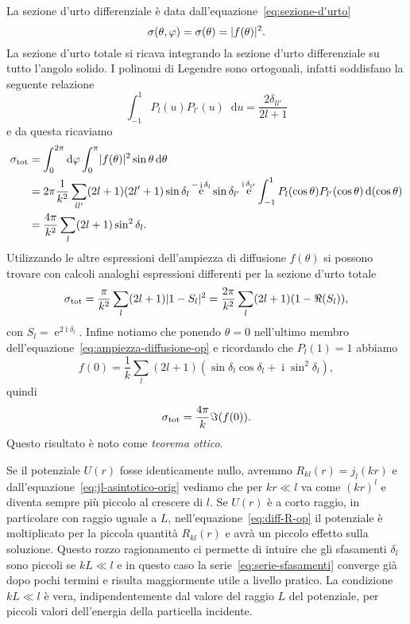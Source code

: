 \documentclass[a4paper,fleqn,twoside,12pt]{article}
\renewcommand{\phi}{\varphi}
\newcommand*{\dd}{\mathop{}\!\mathrm{d}} %
\DeclareMathOperator{\e}{\mathrm{e}} %
\DeclareMathOperator{\uimm}{\mathrm{i}} %
\DeclarePairedDelimiter{\abs}{\lvert}{\rvert}
\begin{document}
La sezione d'urto differenziale è data dall'equazione~\eqref{eq:sezione-d'urto}
\begin{equation}
  \sigma(\theta,\phi) = \sigma(\theta) = \abs{f(\theta)}^{2}.
\end{equation}
La sezione d'urto totale si ricava integrando la sezione d'urto differenziale su
tutto l'angolo solido.  I polinomi di Legendre sono ortogonali, infatti
soddisfano la seguente relazione
\begin{equation}
  \int_{-1}^{1}P_{l}(u)P_{l'}(u)\dd u = \frac{2\delta_{ll'}}{2l+1}
\end{equation}
e da questa ricaviamo
\begin{equation}
  \label{eq:serie-sfasamenti}
  \begin{split}
    \sigma_{\textup{tot}} &= \int_{0}^{2\pi}\dd \phi \int_{0}^{\pi}
    \abs{f(\theta)}^{2} \sin\theta \dd\theta \\
    &= 2\pi \frac{1}{k^{2}} \sum_{ll'}(2l+1)(2l'+1) \sin\delta_{l} \e^{-\uimm
      \delta_{l}} \sin\delta_{l'}\e^{\uimm \delta_{l'}}
    \int_{-1}^{1}P_{l}(\cos\theta)P_{l'}(\cos\theta) \dd(\cos\theta) \\
    &= \frac{4\pi}{k^{2}} \sum_{l}(2l+1)\sin^{2}\delta_{l}.
  \end{split}
\end{equation}
Utilizzando le altre espressioni dell'ampiezza di diffusione $f(\theta)$ si
possono trovare con calcoli analoghi espressioni differenti per la sezione
d'urto totale
\begin{equation}
  \sigma_{\textup{tot}} = \frac{\pi}{k^{2}} \sum_{l}(2l+1)\abs{1 - S_{l}}^{2} =
  \frac{2\pi}{k^{2}} \sum_{l}(2l+1)(1-\Re(S_{l})),
\end{equation}
con $S_{l} = \e^{2\uimm\delta_{l}}$.  Infine notiamo che ponendo $\theta = 0$
nell'ultimo membro dell'equazione~\eqref{eq:ampiezza-diffusione-op} e ricordando
che $P_{l}(1) = 1$ abbiamo
\begin{equation}
  f(0) = \frac{1}{k} \sum_{l}(2l+1)(\sin\delta_{l}\cos\delta_{l} + \uimm
  \sin^{2}\delta_{l}),
\end{equation}
quindi
\begin{equation}
  \sigma_{\textup{tot}} = \frac{4\pi}{k} \Im(f(0)).
\end{equation}
Questo risultato è noto come \emph{teorema ottico}.

Se il potenziale $U(r)$ fosse identicamente nullo, avremmo
$R_{kl}(r) = j_{l}(kr)$ e dall'equazione~\eqref{eq:jl-asintotico-orig} vediamo
che per $kr \ll l$ va come $(kr)^{l}$ e diventa sempre più piccolo al crescere
di $l$.  Se $U(r)$ è a corto raggio, in particolare con raggio uguale a $L$,
nell'equazione~\eqref{eq:diff-R-op} il potenziale è moltiplicato per la piccola
quantità $R_{kl}(r)$ e avrà un piccolo effetto sulla soluzione.  Questo rozzo
ragionamento ci permette di intuire che gli sfasamenti $\delta_{l}$ sono piccoli
se $kL \ll l$ e in questo caso la serie~\eqref{eq:serie-sfasamenti} converge già
dopo pochi termini e risulta maggiormente utile a livello pratico.  La
condizione $kL \ll l$ è vera, indipendentemente dal valore del raggio $L$ del
potenziale, per piccoli valori dell'energia della particella incidente.
\end{document}
